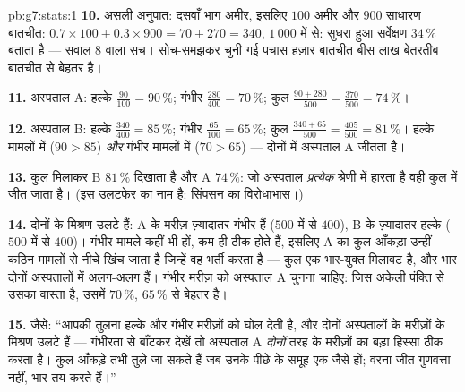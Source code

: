 \begin{solution}{pb:g7:stats:1}
\textbf{10.} असली अनुपात: दसवाँ भाग अमीर, इसलिए $100$ अमीर और
$900$ साधारण बातचीत:
$0.7 \times 100 + 0.3 \times 900 = 70 + 270 = 340$, $1\,000$ में
से: सुधरा हुआ सर्वेक्षण $34\,\%$ बताता है --- सवाल 8 वाला सच।
सोच-समझकर चुनी गई पचास हज़ार बातचीत बीस लाख बेतरतीब बातचीत से
बेहतर है।

\textbf{11.} अस्पताल A: हल्के $\frac{90}{100} = 90\,\%$; गंभीर
$\frac{280}{400} = 70\,\%$; कुल
$\frac{90 + 280}{500} = \frac{370}{500} = 74\,\%$।

\textbf{12.} अस्पताल B: हल्के $\frac{340}{400} = 85\,\%$; गंभीर
$\frac{65}{100} = 65\,\%$; कुल
$\frac{340 + 65}{500} = \frac{405}{500} = 81\,\%$। हल्के मामलों
में ($90 > 85$) \emph{और} गंभीर मामलों में ($70 > 65$) --- दोनों
में अस्पताल A जीतता है।

\textbf{13.} कुल मिलाकर B $81\,\%$ दिखाता है और A $74\,\%$: जो
अस्पताल \emph{प्रत्येक} श्रेणी में हारता है वही कुल में जीत जाता
है। (इस उलटफेर का नाम है: सिंपसन का विरोधाभास।)

\textbf{14.} दोनों के मिश्रण उलटे हैं: A के मरीज़ ज़्यादातर गंभीर
हैं ($500$ में से $400$), B के ज़्यादातर हल्के ($500$ में से
$400$)। गंभीर मामले कहीं भी हों, कम ही ठीक होते हैं, इसलिए A का
कुल आँकड़ा उन्हीं कठिन मामलों से नीचे खिंच जाता है जिन्हें वह भर्ती
करता है --- कुल  एक भार-युक्त मिलावट है, और भार दोनों
अस्पतालों में अलग-अलग हैं। गंभीर मरीज़ को अस्पताल A चुनना चाहिए:
जिस अकेली पंक्ति से उसका वास्ता है, उसमें $70\,\%$, $65\,\%$ से
बेहतर है।

\textbf{15.} जैसे: ``आपकी तुलना हल्के और गंभीर मरीज़ों को घोल
देती है, और दोनों अस्पतालों के मरीज़ों के मिश्रण उलटे हैं ---
गंभीरता से बाँटकर देखें तो अस्पताल A \emph{दोनों} तरह के मरीज़ों
का बड़ा हिस्सा ठीक करता है। कुल आँकड़े तभी तुले जा सकते हैं जब
उनके पीछे के समूह एक जैसे हों; वरना जीत गुणवत्ता नहीं, भार तय
करते हैं।''

\end{solution}
